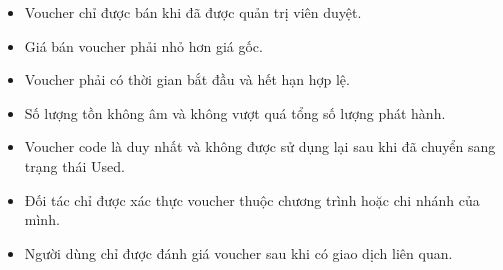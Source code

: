 \begin{itemize}[leftmargin=1.2cm]
    \item Voucher chỉ được bán khi đã được quản trị viên duyệt.
    \item Giá bán voucher phải nhỏ hơn giá gốc.
    \item Voucher phải có thời gian bắt đầu và hết hạn hợp lệ.
    \item Số lượng tồn không âm và không vượt quá tổng số lượng phát hành.
    \item Voucher code là duy nhất và không được sử dụng lại sau khi đã chuyển sang trạng thái Used.
    \item Đối tác chỉ được xác thực voucher thuộc chương trình hoặc chi nhánh của mình.
    \item Người dùng chỉ được đánh giá voucher sau khi có giao dịch liên quan.
\end{itemize}
